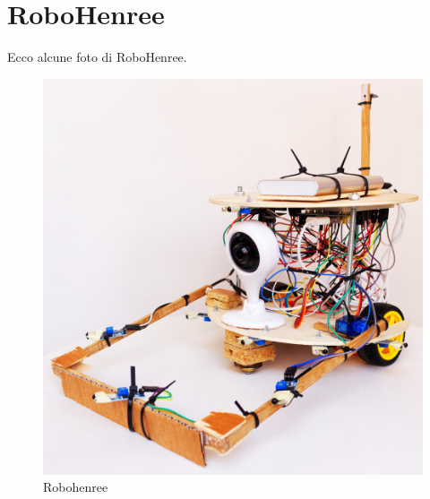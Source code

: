\documentclass[a4paper,12pt,italian]{article}
\begin{document}
\pagebreak
\section{RoboHenree}

Ecco alcune foto di RoboHenree.

\begin{figure}[H]
\begin{center}
\includegraphics[scale=0.13]{robohenree_1}
\caption{Robohenree}
\label{Fig: robohenree}
\end{center}
\end{figure}
\end{document}
